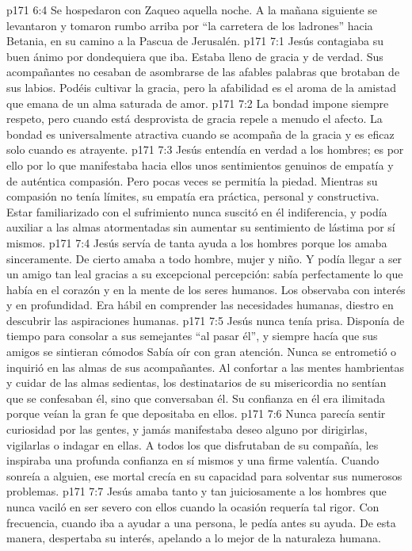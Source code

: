 \vs p171 6:4 Se hospedaron con Zaqueo aquella noche. A la mañana siguiente se levantaron y tomaron rumbo arriba por “la carretera de los ladrones” hacia Betania, en su camino a la Pascua de Jerusalén.
\vs p171 7:1 Jesús contagiaba su buen ánimo por dondequiera que iba. Estaba lleno de gracia y de verdad. Sus acompañantes no cesaban de asombrarse de las afables palabras que brotaban de sus labios. Podéis cultivar la gracia, pero la afabilidad es el aroma de la amistad que emana de un alma saturada de amor.
\vs p171 7:2 La bondad impone siempre respeto, pero cuando está desprovista de gracia repele a menudo el afecto. La bondad es universalmente atractiva cuando se acompaña de la gracia y es eficaz solo cuando es atrayente.
\vs p171 7:3 Jesús entendía en verdad a los hombres; es por ello por lo que manifestaba hacia ellos unos sentimientos genuinos de empatía y de auténtica compasión. Pero pocas veces se permitía la piedad. Mientras su compasión no tenía límites, su empatía era práctica, personal y constructiva. Estar familiarizado con el sufrimiento nunca suscitó en él indiferencia, y podía auxiliar a las almas atormentadas sin aumentar su sentimiento de lástima por sí mismos.
\vs p171 7:4 Jesús servía de tanta ayuda a los hombres porque los amaba sinceramente. De cierto amaba a todo hombre, mujer y niño. Y podía llegar a ser un amigo tan leal gracias a su excepcional percepción: sabía perfectamente lo que había en el corazón y en la mente de los seres humanos. Los observaba con interés y en profundidad. Era hábil en comprender las necesidades humanas, diestro en descubrir las aspiraciones humanas.
\vs p171 7:5 Jesús nunca tenía prisa. Disponía de tiempo para consolar a sus semejantes “al pasar él”, y siempre hacía que sus amigos se sintieran cómodos Sabía oír con gran atención. Nunca se entrometió o inquirió en las almas de sus acompañantes. Al confortar a las mentes hambrientas y cuidar de las almas sedientas, los destinatarios de su misericordia no sentían que se confesaban  él, sino que conversaban  él. Su confianza en él era ilimitada porque veían la gran fe que depositaba en ellos.
\vs p171 7:6 Nunca parecía sentir curiosidad por las gentes, y jamás manifestaba deseo alguno por dirigirlas, vigilarlas o indagar en ellas. A todos los que disfrutaban de su compañía, les inspiraba una profunda confianza en sí mismos y una firme valentía. Cuando sonreía a alguien, ese mortal crecía en su capacidad para solventar sus numerosos problemas.
\vs p171 7:7 Jesús amaba tanto y tan juiciosamente a los hombres que nunca vaciló en ser severo con ellos cuando la ocasión requería tal rigor. Con frecuencia, cuando iba a ayudar a una persona, le pedía antes su ayuda. De esta manera, despertaba su interés, apelando a lo mejor de la naturaleza humana.
